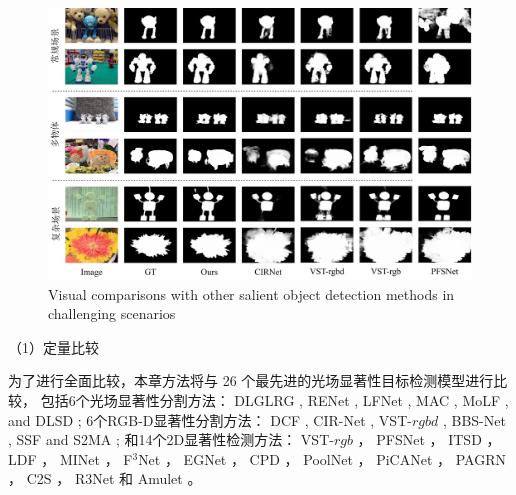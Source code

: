 \begin{figure}[!ht]
	\centering
	\includegraphics[width=\linewidth]{figures/chapter3/compare_2}
	{Visual comparisons with other salient object detection methods in challenging scenarios}
	\label{figure:figure_comparison_2}
\end{figure}


（1）定量比较

为了进行全面比较，本章方法将与 26 个最先进的光场显著性目标检测模型进行比较，
包括6个光场显著性分割方法：
DLGLRG , RENet , LFNet ,
MAC , MoLF , and DLSD ;
%
%
%
%
6个RGB-D显著性分割方法：
DCF , CIR-Net , VST-$rgbd$  ,
BBS-Net     , SSF      and S2MA    ;
%
%
%
%
%
和14个2D显著性检测方法：
VST-$rgb$ ，
PFSNet ，
ITSD ，
LDF ，
MINet ，
F$^{3}$Net  ， 
EGNet   ，
CPD  ，
PoolNet ，
PiCANet ，
PAGRN ，
C2S   ，
R3Net  
和
Amulet 。






